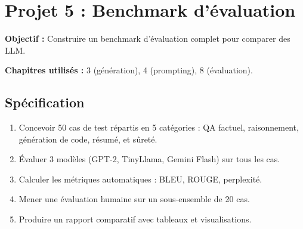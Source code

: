 \section{Projet 5 : Benchmark d'\'evaluation}

\textbf{Objectif :} Construire un benchmark d'\'evaluation complet pour comparer des LLM.

\textbf{Chapitres utilis\'es :} 3 (g\'en\'eration), 4 (prompting), 8 (\'evaluation).

\subsection{Sp\'ecification}

\begin{enumerate}
  \item Concevoir 50 cas de test r\'epartis en 5 cat\'egories : QA factuel, raisonnement, g\'en\'eration de code, r\'esum\'e, et s\^uret\'e.
  \item \'Evaluer 3 mod\`eles (GPT-2, TinyLlama, Gemini Flash) sur tous les cas.
  \item Calculer les m\'etriques automatiques : BLEU, ROUGE, perplexit\'e.
  \item Mener une \'evaluation humaine sur un sous-ensemble de 20 cas.
  \item Produire un rapport comparatif avec tableaux et visualisations.
\end{enumerate}

